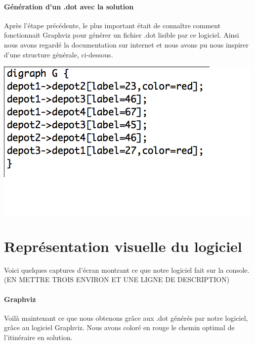 \documentclass[12pt,a4paper]{report}
\begin{document}
\paragraph{Génération d'un .dot avec la solution}
Après l'étape précédente, le plus important était de connaître comment fonctionnait Graphviz pour générer un fichier .dot lisible par ce logiciel. Ainsi nous avons regardé la documentation sur internet et nous avons pu nous inspirer d'une structure générale, ci-dessous.
\begin{center}
\includegraphics[scale=0.4]{capture3.png}
\end{center}


\section{Représentation visuelle du logiciel}
Voici quelques captures d'écran montrant ce que notre logiciel fait sur la console. (EN METTRE TROIS ENVIRON ET UNE LIGNE DE DESCRIPTION)

\paragraph{Graphviz}
Voilà maintenant ce que nous obtenons grâce aux .dot générés par notre logiciel, grâce au logiciel Graphviz. Nous avons coloré en rouge le chemin optimal de l'itinéraire en solution.
\end{document}
